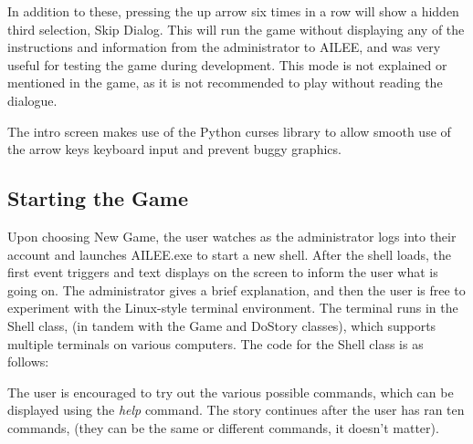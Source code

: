 \documentclass[conference]{IEEEtran}
\begin{document}
In addition to these, pressing the up arrow six times in a row will show a hidden third selection, Skip Dialog. This will run the game without displaying any of the instructions and information from the administrator to AILEE, and was very useful for testing the game during development. This mode is not explained or mentioned in the game, as it is not recommended to play without reading the dialogue.

The intro screen makes use of the Python curses library to allow smooth use of the arrow keys keyboard input and prevent buggy graphics.

\subsection{Starting the Game}
Upon choosing New Game, the user watches as the administrator logs into their account and launches AILEE.exe to start a new shell. After the shell loads, the first event triggers and text displays on the screen to inform the user what is going on. The administrator gives a brief explanation, and then the user is free to experiment with the Linux-style terminal environment. The terminal runs in the Shell class, (in tandem with the Game and DoStory classes), which supports multiple terminals on various computers. The code for the Shell class is as follows:



The user is encouraged to try out the various possible commands, which can be displayed using the \textit{help} command. The story continues after the user has ran ten commands, (they can be the same or different commands, it doesn't matter).
\end{document}
